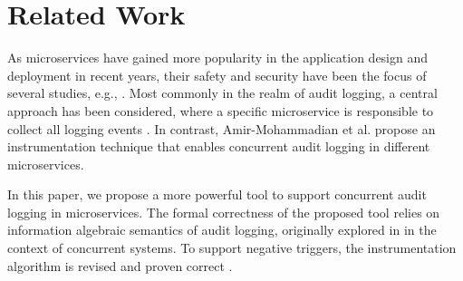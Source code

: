 \section{Related Work} \label{sec:relwork}

As microservices have gained more popularity in the application design and deployment in recent years, their safety and security have been the focus of several studies, e.g., \cite{mateus2021security, nkomo2019software, nehme2019securing, yu2019survey}. Most commonly in the realm of audit logging, a central approach has been considered, where a specific microservice is responsible to collect all logging events \cite{barabanov2021security, kazanavivcius2019migrating}. In contrast, Amir-Mohammadian et al. \cite{stpsa21} propose an instrumentation technique that enables concurrent audit logging in different microservices. 

In this paper, we propose a more powerful tool to support concurrent audit logging in microservices. The formal correctness of the proposed tool relies on information algebraic \cite{Kohlas14} semantics of audit logging, originally explored in \cite{lsfa20}  in the context of concurrent systems. To support negative triggers, the instrumentation algorithm is revised and proven correct \cite{amirmoh-tr21}. 


